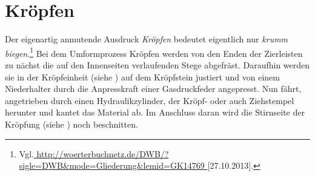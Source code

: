 \documentclass[12pt,a4paper,parskip,twoside,BCOR5mm,headsepline]{scrartcl}
\begin{document}
\begin{description*}
\begin{table}
\begin{tabular}{cccccccccccc}
\end{tabular}
\end{table}
\newpage














\section{Kröpfen \label{sec:kropf}}

Der eigenartig anmutende Ausdruck \emph{Kröpfen} bedeutet eigentlich nur \emph{krumm biegen}.\footnote{Vgl.\url{
http://woerterbuchnetz.de/DWB/?sigle=DWB&mode=Gliederung&lemid=GK14769
}[27.10.2013].}
Bei dem Umformprozess Kröpfen werden von den  Enden der Zierleisten zu nächst die auf den Innenseiten verlaufenden Stege  abgefräst.  Daraufhin werden sie in der Kröpfeinheit (siehe ) auf dem Kröpfstein justiert und von einem Niederhalter durch die Anpresskraft einer Gasdruckfeder angepresst. Nun fährt, angetrieben durch einen Hydraulikzylinder, der Kröpf- oder auch Ziehstempel herunter und kantet das Material ab. Im Anschluss daran wird die Stirnseite der Kröpfung (siehe ) noch beschnitten.
\begin{figure}[hbtp]
\centering
\hfill

\end{figure}
\end{description*}
\end{document}
